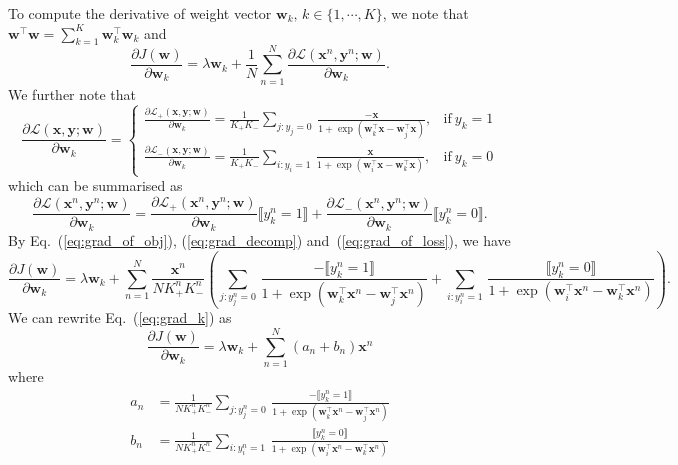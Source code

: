 \documentclass[9pt]{extarticle}
\newcommand{\llb}{\llbracket}
\newcommand{\rrb}{\rrbracket}
\newcommand{\x}{\mathbf{x}}
\newcommand{\y}{\mathbf{y}}
\newcommand{\1}{\mathbf{1}}
\newcommand{\w}{\mathbf{w}}
\newcommand{\LCal}{\mathcal{L}}
\begin{document}
To compute the derivative of weight vector $\w_k, \, k \in \{1,\cdots,K\}$, we note that $\w^\top \w = \sum_{k=1}^K \w_k^\top \w_k$ and 
\begin{equation}
\label{eq:grad_of_obj}
\frac{\partial J(\w)} {\partial \w_k} = \lambda \w_k + \frac{1}{N} \sum_{n=1}^N \frac{\partial \LCal(\x^n, \y^n; \w)} {\partial \w_k}.
\end{equation}
We further note that 
\begin{equation}
\label{eq:grad_decomp}
\frac{\partial \LCal(\x, \y; \w)} {\partial \w_k} =
\begin{cases}
\frac{\partial \LCal_+(\x, \y; \w)} {\partial \w_k} = \frac{1}{K_+ K_-} \underset{j:y_j=0}{\sum} \, \frac{-\x} {1 + \exp(\w_k^\top \x - \w_j^\top \x)}, 
    & \text{if} \ y_k=1 \\
\frac{\partial \LCal_-(\x, \y; \w)} {\partial \w_k} = \frac{1}{K_+ K_-} \underset{i:y_i=1}{\sum} \, \frac{\x} {1 + \exp(\w_i^\top \x - \w_k^\top \x)},
    & \text{if} \ y_k=0
\end{cases}
\end{equation}
which can be summarised as
\begin{equation}
\label{eq:grad_of_loss}
\frac{\partial \LCal(\x^n, \y^n; \w)} {\partial \w_k} =
\frac{\partial \LCal_+(\x^n, \y^n; \w)} {\partial \w_k} \llb y_k^n=1 \rrb +
\frac{\partial \LCal_-(\x^n, \y^n; \w)} {\partial \w_k} \llb y_k^n=0 \rrb.
\end{equation}
%
By Eq.~(\ref{eq:grad_of_obj}), (\ref{eq:grad_decomp}) and~(\ref{eq:grad_of_loss}), we have
\begin{equation}
\label{eq:grad_k}
\frac{\partial J(\w)} {\partial \w_k} = \lambda \w_k + \sum_{n=1}^N \frac{\x^n}{N K_+^n K_-^n} \left(
\underset{j:y_j^n=0}{\sum} \, \frac{-\llb y_k^n=1 \rrb} {1 + \exp(\w_k^\top \x^n - \w_j^\top \x^n)} +
\underset{i:y_i^n=1}{\sum} \, \frac{ \llb y_k^n=0 \rrb} {1 + \exp(\w_i^\top \x^n - \w_k^\top \x^n)} \right).
\end{equation}
%
We can rewrite Eq.~(\ref{eq:grad_k}) as
$$
\frac{\partial J(\w)} {\partial \w_k} = \lambda \w_k + \sum_{n=1}^N (a_n + b_n) \x^n
$$
where
\begin{align*}
a_n &= \frac{1}{N K_+^n K_-^n} \underset{j:y_j^n=0}{\sum} \, \frac{-\llb y_k^n=1 \rrb} {1 + \exp(\w_k^\top \x^n - \w_j^\top \x^n)} \\
b_n &= \frac{1}{N K_+^n K_-^n} \underset{i:y_i^n=1}{\sum} \, \frac{ \llb y_k^n=0 \rrb} {1 + \exp(\w_i^\top \x^n - \w_k^\top \x^n)}
\end{align*}
\end{document}
